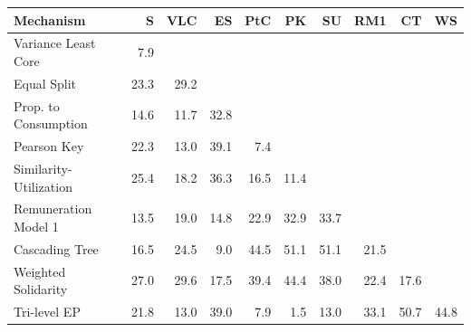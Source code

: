 \begin{tabular}{lrrrrrrrrr}
\toprule
Mechanism & S & VLC & ES & PtC & PK & SU & RM1 & CT & WS \\
\midrule
Variance Least Core & 7.9 &  &  &  &  &  &  &  &  \\
Equal Split & 23.3 & 29.2 &  &  &  &  &  &  &  \\
Prop. to Consumption & 14.6 & 11.7 & 32.8 &  &  &  &  &  &  \\
Pearson Key & 22.3 & 13.0 & 39.1 & 7.4 &  &  &  &  &  \\
Similarity-Utilization & 25.4 & 18.2 & 36.3 & 16.5 & 11.4 &  &  &  &  \\
Remuneration Model 1 & 13.5 & 19.0 & 14.8 & 22.9 & 32.9 & 33.7 &  &  &  \\
Cascading Tree & 16.5 & 24.5 & 9.0 & 44.5 & 51.1 & 51.1 & 21.5 &  &  \\
Weighted Solidarity & 27.0 & 29.6 & 17.5 & 39.4 & 44.4 & 38.0 & 22.4 & 17.6 &  \\
Tri-level EP & 21.8 & 13.0 & 39.0 & 7.9 & 1.5 & 13.0 & 33.1 & 50.7 & 44.8 \\
\bottomrule
\end{tabular}
